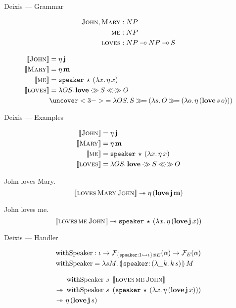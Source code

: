 \documentclass{beamer}
\begin{document}
\begin{frame}{Deixis --- Grammar}

\begin{align*}
  \textsc{John}, \textsc{Mary} &: NP \\
  \textsc{me} &: NP \\
  \textsc{loves} &: NP \mathbin{{-}\mkern-3.5mu{\circ}} NP \mathbin{{-}\mkern-3.5mu{\circ}} S
\end{align*}

\pause

\begin{align*}
  \lex{John}{\etaE{\obj{j}}} \\
  \lex{Mary}{\etaE{\obj{m}}} \\
  \lex{me}{\app{\op{speaker}}{\star}{(\lam{x}{\etaE{x}})}} \\
  \lex{loves}{\lam{O S}{{\obj{love}} \apr S \aplr O}} \\
  &\uncover<3->{= \lam{O S}{S \hsbind (\lam{s}{O \hsbind (\lam{o}{\etaE{(\app{\obj{love}}{s}{o})}})})}}
\end{align*}
\end{frame}


\begin{frame}{Deixis --- Examples}

\begin{align*}
  \llbracket \textsc{John} \rrbracket &= \eta\,\textbf{j} \\
  \llbracket \textsc{Mary} \rrbracket &= \eta\,\textbf{m} \\
  \llbracket \textsc{me} \rrbracket &= \mathtt{speaker}\,\star\,(\lambda x.\, \eta\,x) \\
  \llbracket \textsc{loves} \rrbracket &= \lambda O S.\, {\textbf{love}} \mathbin{\cdot\!\!\gg} S \mathbin{\ll\!\!\cdot\!\!\gg} O
\end{align*}

  John loves Mary.
  $$
  \llbracket \textsc{loves}\,\textsc{Mary}\,\textsc{John} \rrbracket \twoheadrightarrow 
  \eta\,(\textbf{love}\,\textbf{j}\,\textbf{m})
  $$
  
  John loves me.
  $$
  \llbracket \textsc{loves}\,\textsc{me}\,\textsc{John} \rrbracket \twoheadrightarrow
  \mathtt{speaker}\,\star\,(\lambda x.\, \eta\,(\textbf{love}\,\textbf{j}\,x))
  $$
\end{frame}


\begin{frame}{Deixis --- Handler}

  \begin{align*}
  \withSpeaker &: \iota \to \FF_{\{\typedop{speaker}{1}{\iota}\} \uplus
    E}(\alpha) \to \FF_E(\alpha) \\
  \withSpeaker &= \lam{s M}{\ap{\banana{\onto{\op{speaker}}{(\lam{\_ k}{\ap{k}{s}})}}}{M}}
  \end{align*}

  \vfill
  \pause
  
  \begin{align*}
  &\app{\withSpeaker}{s}{\ \sem{\app{\abs{loves}}{\abs{me}}{\abs{John}}}} \\
  \tto\ &\app{\withSpeaker}{s}{\ (\app{\op{speaker}}{\star}{(\lam{x}{\etaE{(\app{\obj{love}}{\obj{j}}{x})}})})} \\
  \tto\ &\etaE{(\app{\obj{love}}{\obj{j}}{s})}
  \end{align*}
\end{frame}
\end{document}
